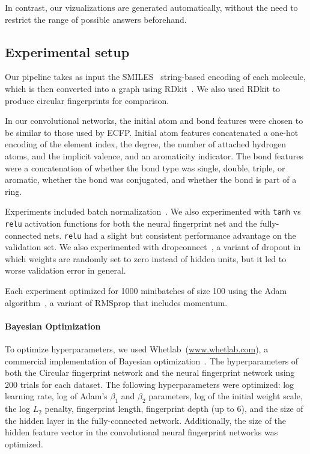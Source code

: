 \documentclass{article}
\begin{document}
In contrast, our vizualizations are generated automatically, without the need to restrict the range of possible answers beforehand.

\subsection{Experimental setup}
Our pipeline takes as input the SMILES~\citep{weininger1988smiles} string-based encoding of each molecule, which is then converted into a graph using RDkit~\citep{rdkit}.
We also used RDkit to produce circular fingerprints for comparison.

In our convolutional networks, the initial atom and bond features were chosen to be similar to those used by ECFP.
Initial atom features concatenated a one-hot encoding of the element index, the degree, the number of attached hydrogen atoms, and the implicit valence, and an aromaticity indicator.
The bond features were a concatenation of whether the bond type was single, double, triple, or aromatic, whether the bond was conjugated, and whether the bond is part of a ring.

Experiments included batch normalization~\citep{ioffe2015batch}.
We also experimented with \texttt{tanh} vs \texttt{relu} activation functions for both the neural fingerprint net and the fully-connected nets.
\texttt{relu} had a slight but consistent performance advantage on the validation set.
We also experimented with dropconnect~\citep{wan2013regularization}, a variant of dropout in which weights are randomly set to zero instead of hidden units, but it led to worse validation error in general.

Each experiment optimized for 1000 minibatches of size 100 using the Adam algorithm~\citep{Adam14}, a variant of RMSprop that includes momentum.

\paragraph{Bayesian Optimization}
To optimize hyperparameters, we used Whetlab~(\url{www.whetlab.com}), a commercial implementation of Bayesian optimization~\citep{snoek2012practical}.
The hyperparameters of both the Circular fingerprint network and the neural fingerprint network using 200 trials for each dataset.
The following hyperparameters were optimized: log learning rate, log of Adam's $\beta_1$ and $\beta_2$ parameters, log of the initial weight scale, the log $L_2$ penalty, fingerprint length, fingerprint depth (up to 6), and the size of the hidden layer in the fully-connected network.
Additionally, the size of the hidden feature vector in the convolutional neural fingerprint networks was optimized.
\end{document}
